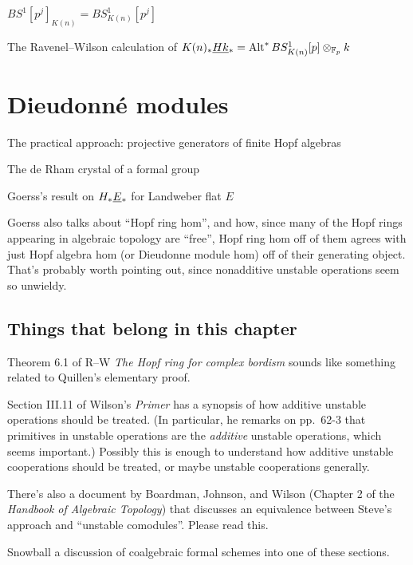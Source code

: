 
$BS^1[p^j]_{K(n)} = BS^1_{K(n)}[p^j]$

The Ravenel--Wilson calculation of $K(n)_* \smash{\underline{Hk}}_{*} = \operatorname{Alt}^* BS^1_{K(n)}[p] \otimes_{\mathbb F_p} k$



\section{Dieudonn\'e modules}

The practical approach: projective generators of finite Hopf algebras

The de Rham crystal of a formal group

Goerss's result on $H_* \smash{\underline{E}}_{*}$ for Landweber flat $E$



Goerss also talks about ``Hopf ring hom'', and how, since many of the Hopf rings appearing in algebraic topology are ``free'', Hopf ring hom off of them agrees with just Hopf algebra hom (or Dieudonne module hom) off of their generating object.  That's probably worth pointing out, since nonadditive unstable operations seem so unwieldy.







\subsection*{Things that belong in this chapter}

Theorem 6.1 of R--W \textit{The Hopf ring for complex bordism} sounds like something related to Quillen's elementary proof.

Section III.11 of Wilson's \textit{Primer} has a synopsis of how additive unstable operations should be treated.  (In particular, he remarks on pp.\ 62-3 that primitives in unstable operations are the \emph{additive} unstable operations, which seems important.)  Possibly this is enough to understand how additive unstable cooperations should be treated, or maybe unstable cooperations generally.

There's also a document by Boardman, Johnson, and Wilson (Chapter 2 of the \textit{Handbook of Algebraic Topology}) that discusses an equivalence between Steve's approach and ``unstable comodules''.  Please read this.

Snowball a discussion of coalgebraic formal schemes into one of these sections.





